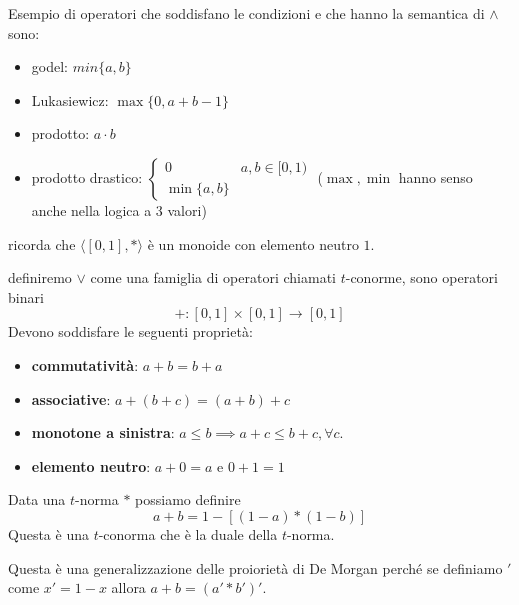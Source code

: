\begin{esempio}
    Esempio di operatori che soddisfano le condizioni e che hanno la semantica di 
    $\land$ sono:
    \begin{itemize}
        \item godel: $min\{a,b\}$
        \item Lukasiewicz: $\max\{0,a+b-1\}$
        \item prodotto: $a\cdot b$ 
        \item prodotto drastico: $\begin{cases}
            0& a,b\in [0,1)\\
            \min\{a,b\}
        \end{cases}$ ($\max, \min$ hanno senso anche nella logica a $3$ valori)
    \end{itemize}
\end{esempio}

\begin{nota}
    ricorda che $\langle [0,1], \ast\rangle$ è un monoide con elemento neutro $1$. 
\end{nota}



\begin{definizione}
    definiremo $\lor$ come una famiglia di operatori chiamati $t$-conorme, sono operatori binari 
    $$+ : [0,1]\times [0,1]\to [0,1]$$
    Devono soddisfare le seguenti proprietà:
    \begin{itemize}
        \item \textbf{commutatività}: $a+ b = b+ a$
        \item \textbf{associative}: $a+ (b+ c) = (a+ b)+ c$
        \item \textbf{monotone a sinistra}: $a\le b\implies a+ c \le b+ c,\forall c$.
        \item \textbf{elemento neutro}: $a+ 0 = a$ e $0+ 1 = 1$
    \end{itemize}
\end{definizione}
\begin{teorema}
Data una $t$-norma $\ast$ possiamo definire $$a+b= 1-[(1-a)\ast (1-b)]$$ Questa è una 
$t$-conorma che è la duale della $t$-norma.
\end{teorema}
\begin{nota}
    Questa è una generalizzazione delle 
    proiorietà di De Morgan perché se definiamo $'$ come $x'= 1-x$ allora $a+b = (a'\ast  b')'$.    
\end{nota}


